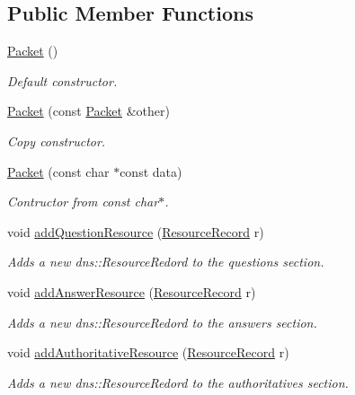\subsection*{Public Member Functions}
\begin{DoxyCompactItemize}
\item 
\hyperlink{structdns_1_1Packet_a686821b6c288359603304ae9c075f3f1}{Packet} ()
\begin{DoxyCompactList}\small\item\em Default constructor. \end{DoxyCompactList}\item 
\hyperlink{structdns_1_1Packet_a7cc92466b5291c0f4773092084836495}{Packet} (const \hyperlink{structdns_1_1Packet}{Packet} \&other)
\begin{DoxyCompactList}\small\item\em Copy constructor. \end{DoxyCompactList}\item 
\hyperlink{structdns_1_1Packet_a90c293bc5bc7bad9c47be19d6060b82a}{Packet} (const char $\ast$const data)
\begin{DoxyCompactList}\small\item\em Contructor from const char$\ast$. \end{DoxyCompactList}\item 
void \hyperlink{structdns_1_1Packet_ac9e9b7e48afc984d949b0062feef13fe}{add\+Question\+Resource} (\hyperlink{structdns_1_1ResourceRecord}{Resource\+Record} r)
\begin{DoxyCompactList}\small\item\em Adds a new dns\+::\+Resource\+Redord to the questions section. \end{DoxyCompactList}\item 
void \hyperlink{structdns_1_1Packet_aa5e426126e1b03f0ca2e874bd7453864}{add\+Answer\+Resource} (\hyperlink{structdns_1_1ResourceRecord}{Resource\+Record} r)
\begin{DoxyCompactList}\small\item\em Adds a new dns\+::\+Resource\+Redord to the answers section. \end{DoxyCompactList}\item 
void \hyperlink{structdns_1_1Packet_ac7aac0fb6f1d988b6e74f6dae4c0dd8a}{add\+Authoritative\+Resource} (\hyperlink{structdns_1_1ResourceRecord}{Resource\+Record} r)
\begin{DoxyCompactList}\small\item\em Adds a new dns\+::\+Resource\+Redord to the authoritatives section. \end{DoxyCompactList}\item 

\end{DoxyCompactItemize}
